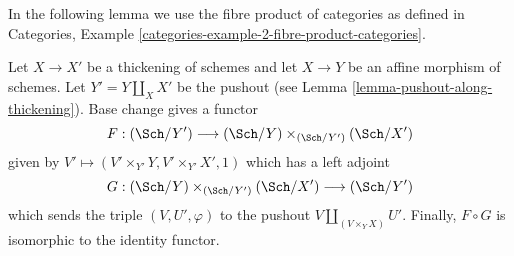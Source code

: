 \noindent
In the following lemma we use the fibre product of categories as
defined in
Categories, Example \ref{categories-example-2-fibre-product-categories}.

\begin{lemma}
\label{lemma-equivalence-categories-schemes-over-pushout}
Let $X \to X'$ be a thickening of schemes and let $X \to Y$ be an
affine morphism of schemes. Let $Y' = Y \amalg_X X'$ be the pushout
(see Lemma \ref{lemma-pushout-along-thickening}). Base change gives
a functor
$$
F : (\Sch/Y') \longrightarrow (\Sch/Y) \times_{(\Sch/Y')} (\Sch/X')
$$
given by $V' \longmapsto (V' \times_{Y'} Y, V' \times_{Y'} X', 1)$
which has a left adjoint
$$
G : (\Sch/Y) \times_{(\Sch/Y')} (\Sch/X') \longrightarrow (\Sch/Y')
$$
which sends the triple $(V, U', \varphi)$ to the pushout
$V \amalg_{(V \times_Y X)} U'$. Finally, $F \circ G$ is isomorphic to the
identity functor.
\end{lemma}

